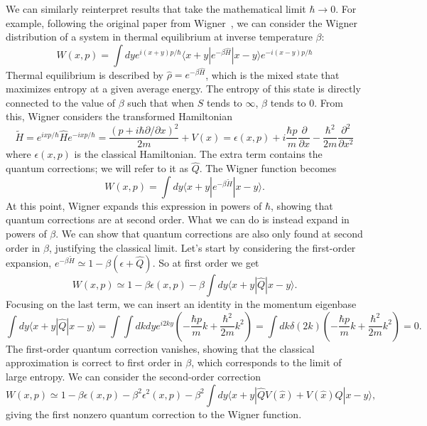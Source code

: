 \documentclass{article}
\begin{document}
We can similarly reinterpret results that take the mathematical limit $\hbar \to 0$. For example, following the original paper from Wigner~\cite{WignerLimit}, we can consider the Wigner distribution of a system in thermal equilibrium at inverse temperature $\beta$:
\begin{equation}
    W(x,p)=\int dy e^{i(x+y)p/\hbar}\langle x+y |e^{-\beta\hat{H}}|x-y \rangle e^{-i(x-y)p/\hbar}
\end{equation}
Thermal equilibrium is described by $\hat{\rho}=e^{-\beta \hat{H}}$, which is the mixed state that maximizes entropy at a given average energy. The entropy of this state is directly connected to the value of $\beta$ such that when $S$ tends to $\infty$, $\beta$ tends to 0.
From this, Wigner considers the transformed Hamiltonian
\begin{equation}
    \tilde{H}=e^{i x p/\hbar}\hat{H} e^{-i x p/\hbar}=\frac{(p+i\hbar\partial/\partial x)^2}{2m}+V(x)=\epsilon(x,p)+i\frac{\hbar p}{m}\frac{\partial}{\partial x}-\frac{\hbar^2}{2m}\frac{\partial^2}{\partial x^2}
\end{equation}
where $\epsilon(x,p)$ is the classical Hamiltonian. The extra term contains the quantum corrections; we will refer to it as $\hat{Q}$. The Wigner function becomes
\begin{equation}
    W(x,p)=\int dy \langle x+y |e^{-\beta\tilde{H}}|x-y \rangle. 
\end{equation}
At this point, Wigner expands this expression in powers of $\hbar$, showing that quantum corrections are at second order. What we can do is instead expand in powers of $\beta$. We can show that quantum corrections are also only found at second order in $\beta$, justifying the classical limit. Let's start by considering the first-order expansion, $e^{-\beta\tilde{H}}\simeq 1-\beta(\epsilon+\hat{Q})$. So at first order
we get
\begin{equation}
    W(x,p)\simeq 1-\beta \epsilon(x,p)-\beta\int dy\langle x+y |\hat{Q}|x-y \rangle.
\end{equation}
Focusing on the last term, we can insert an identity in the momentum eigenbase
\begin{equation}
  \int dy\langle x+y |\hat{Q}|x-y \rangle=\int\int dkdy e^{i2ky} \left(-\frac{\hbar p}{m}k+\frac{\hbar^2}{2m}k^2\right)=\int dk \delta(2k) \left(-\frac{\hbar p}{m}k+\frac{\hbar^2}{2m}k^2\right)=0.
\end{equation}
The first-order quantum correction vanishes, showing that the classical approximation is correct to first order in $\beta$, which corresponds to the limit of large entropy. We can consider the second-order correction
\begin{equation}
     W(x,p)\simeq 1-\beta \epsilon(x,p)-\beta^2\epsilon^2(x,p)-\beta^2\int dy\langle x+y |\hat{Q}V(\hat{x})+V(\hat{x}) \hat{Q}|x-y \rangle,
\end{equation}
giving the first nonzero quantum correction to the Wigner function.
\end{document}
